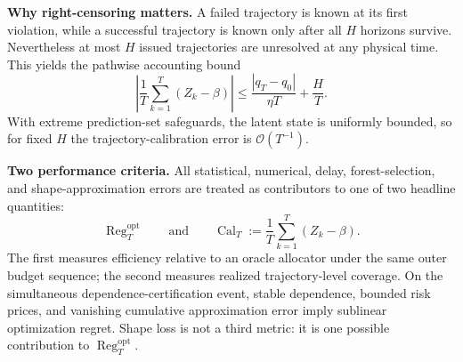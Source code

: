 \documentclass[11pt]{article}
\begin{document}
\smallskip
\noindent
\textbf{Why right-censoring matters.}
A failed trajectory is known at its first violation, while a successful
trajectory is known only after all $H$ horizons survive.  Nevertheless at most
$H$ issued trajectories are unresolved at any physical time.  This yields the
pathwise accounting bound
\[
    \left|
        \frac1T\sum_{k=1}^T(Z_k-\beta)
    \right|
    \le
    \frac{|q_T-q_0|}{\eta T}
    +
    \frac HT.
\]
With extreme prediction-set safeguards, the latent state is uniformly bounded,
so for fixed $H$ the trajectory-calibration error is $\mathcal O(T^{-1})$.

\smallskip
\noindent
\textbf{Two performance criteria.}
All statistical, numerical, delay, forest-selection, and shape-approximation
errors are treated as contributors to one of two headline quantities:
\[
    \boxed{
    \operatorname{Reg}^{\mathrm{opt}}_T
    }
    \qquad\text{and}\qquad
    \boxed{
    \operatorname{Cal}_T
    :=
    \frac1T\sum_{k=1}^T(Z_k-\beta).
    }
\]
The first measures efficiency relative to an oracle allocator under the same
outer budget sequence; the second measures realized trajectory-level coverage.
On the simultaneous dependence-certification event, stable dependence,
bounded risk prices, and vanishing cumulative approximation error imply
sublinear optimization regret.  Shape loss is not a
third metric: it is one possible contribution to
$\operatorname{Reg}^{\mathrm{opt}}_T$.
\normalsize

\clearpage
\end{document}

